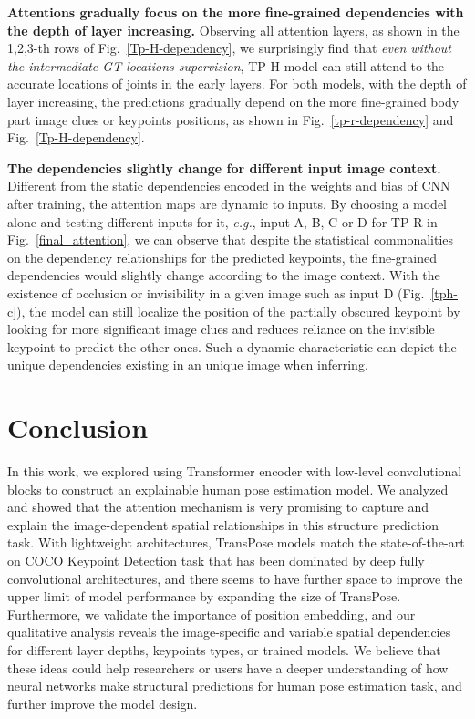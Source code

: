 \documentclass{article}
\begin{document}
{\bf Attentions gradually focus on the more fine-grained dependencies with the depth of layer increasing.}  Observing all attention layers, as shown in the 1,2,3-th rows of Fig.~\ref{Tp-H-dependency}, we surprisingly find that \emph{even without the intermediate GT locations supervision}, TP-H model can still attend to the accurate locations of joints in the early layers. For both models, with the depth of layer increasing, the predictions gradually depend on the more fine-grained body part image clues or keypoints positions, as shown in Fig.~\ref{tp-r-dependency} and Fig.~\ref{Tp-H-dependency}.

{\bf The dependencies slightly change for different input image context.} Different from the static dependencies encoded in the weights and bias of CNN after training, the attention maps are dynamic to inputs. By choosing a model alone and testing different inputs for it, \emph{e.g.}, input A, B, C or D for TP-R in Fig.~\ref{final_attention}, we can observe that despite the statistical commonalities on the dependency relationships for the predicted keypoints, the fine-grained dependencies would slightly change according to the image context. With the existence of occlusion or invisibility in a given image such as input D (Fig.~\ref{tph-c}), the model can still localize the position of the partially obscured keypoint by looking for more significant image clues and reduces reliance on the invisible keypoint to predict the other ones. Such a dynamic characteristic can depict the unique dependencies existing in an unique image when inferring.

\section{Conclusion}

In this work, we explored using Transformer encoder with low-level convolutional blocks to construct an explainable human pose estimation model. We analyzed and showed that the attention mechanism is very promising to capture and explain the image-dependent spatial relationships in this structure prediction task. With lightweight architectures, TransPose models match the state-of-the-art on COCO Keypoint Detection task that has been dominated by deep fully convolutional architectures, and there seems to have further space to improve the upper limit of model performance by expanding the size of TransPose. Furthermore, we validate the importance of position embedding, and our qualitative analysis reveals the image-specific and variable spatial dependencies for different layer depths, keypoints types, or trained models. We believe that these ideas could help researchers or users have a deeper understanding of how neural networks make structural predictions for human pose estimation task, and further improve the model design. 
\end{document}
